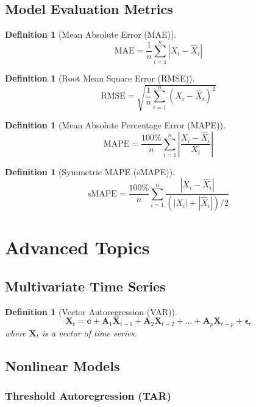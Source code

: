 \documentclass[11pt,a4paper]{article}
\newtheorem{definition}[theorem]{Definition}
\begin{document}
\subsection{Model Evaluation Metrics}

\begin{definition}[Mean Absolute Error (MAE)]
$$\text{MAE} = \frac{1}{n}\sum_{i=1}^n |X_i - \hat{X}_i|$$
\end{definition}

\begin{definition}[Root Mean Square Error (RMSE)]
$$\text{RMSE} = \sqrt{\frac{1}{n}\sum_{i=1}^n (X_i - \hat{X}_i)^2}$$
\end{definition}

\begin{definition}[Mean Absolute Percentage Error (MAPE)]
$$\text{MAPE} = \frac{100\%}{n}\sum_{i=1}^n \left|\frac{X_i - \hat{X}_i}{X_i}\right|$$
\end{definition}

\begin{definition}[Symmetric MAPE (sMAPE)]
$$\text{sMAPE} = \frac{100\%}{n}\sum_{i=1}^n \frac{|X_i - \hat{X}_i|}{(|X_i| + |\hat{X}_i|)/2}$$
\end{definition}

\section{Advanced Topics}

\subsection{Multivariate Time Series}

\begin{definition}[Vector Autoregression (VAR)]
$$\mathbf{X}_t = \mathbf{c} + \mathbf{A}_1\mathbf{X}_{t-1} + \mathbf{A}_2\mathbf{X}_{t-2} + \ldots + \mathbf{A}_p\mathbf{X}_{t-p} + \boldsymbol{\epsilon}_t$$
where $\mathbf{X}_t$ is a vector of time series.
\end{definition}

\subsection{Nonlinear Models}

\subsubsection{Threshold Autoregression (TAR)}
\end{document}
